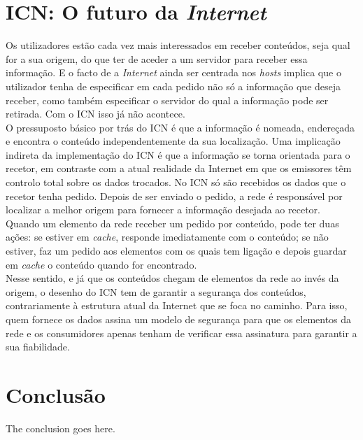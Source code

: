 \documentclass[conference]{IEEEtran}
\begin{document}
\section{ICN: O futuro da \textit{Internet}}

Os utilizadores est\~{a}o cada vez mais interessados em receber conte\'{u}dos, seja qual for a sua origem, do que ter de aceder a um servidor para receber essa informa\c{c}\~{a}o. E o facto de a \textit{Internet} ainda ser centrada nos \textit{hosts} implica que o utilizador tenha de especificar em cada pedido n\~{a}o s\'{o} a informa\c{c}\~{a}o que deseja receber, como tamb\'{e}m especificar o servidor do qual a informa\c{c}\~{a}o pode ser retirada. Com o ICN isso j\'{a} n\~{a}o acontece\cite{surveyICN}.\\

O pressuposto b\'{a}sico por tr\'{a}s do ICN \'{e} que a informa\c{c}\~{a}o \'{e} nomeada, endere\c{c}ada e encontra o conte\'{u}do independentemente da sua localiza\c{c}\~{a}o. Uma implica\c{c}\~{a}o indireta da implementa\c{c}\~{a}o do ICN \'{e} que a informa\c{c}\~{a}o se torna orientada para o recetor, em contraste com a atual realidade da Internet em que os emissores t\^{e}m controlo total sobre os dados trocados\cite{publishSubscribe}. No ICN s\'{o} s\~{a}o recebidos os dados que o recetor tenha pedido. Depois de ser enviado o pedido, a rede \'{e} respons\'{a}vel por localizar a melhor origem para fornecer a informa\c{c}\~{a}o desejada ao recetor.\\

Quando um elemento da rede receber um pedido por conte\'{u}do, pode ter duas a\c{c}\~{o}es: se estiver em \textit{cache}, responde imediatamente com o conte\'{u}do; se n\~{a}o estiver, faz um pedido aos elementos com os quais tem liga\c{c}\~{a}o e depois guardar em \textit{cache} o conte\'{u}do quando for encontrado\cite{surveyICN}.\\

Nesse sentido, e j\'{a} que os conte\'{u}dos chegam de elementos da rede ao inv\'{e}s da origem, o desenho do ICN tem de garantir a seguran\c{c}a dos conte\'{u}dos, contrariamente \`{a} estrutura atual da Internet que se foca no caminho. Para isso, quem fornece os dados assina um modelo de seguran\c{c}a para que os elementos da rede e os consumidores apenas tenham de verificar essa assinatura para garantir a sua fiabilidade\cite{icnForest}.\\


\section{Conclus\~{a}o}
The conclusion goes here.\\

\IEEEtriggercmd{\enlargethispage{-5in}}



\end{document}
